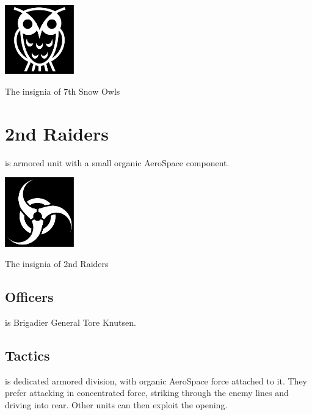 \documentclass{tufte-book}
\begin{document}
\begin{marginfigure}[0\baselineskip]
  \includegraphics[width=3cm]{owl}
  \caption{The insignia of 7th Snow Owls}
  \label{fig:snow_owls}
\end{marginfigure}

\section{2nd Raiders}

 is armored unit with a small organic AeroSpace
component.

\begin{marginfigure}[0\baselineskip]
  \includegraphics[width=3cm]{regeneration}
  \caption{The insignia of 2nd Raiders}
  \label{fig:raiders}
\end{marginfigure}

\subsection{Officers}

 is Brigadier General Tore Knutsen.

\subsection{Tactics}

 is dedicated armored division, with organic AeroSpace
force attached to it. They prefer attacking in concentrated force,
striking through the enemy lines and driving into rear. Other units can then
exploit the opening.

\bigskip
{}
\end{document}
